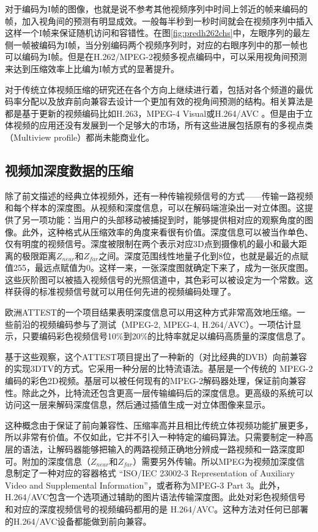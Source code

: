对于编码为I帧的图像，也就是说不参考其他视频序列中时间上邻近的帧来编码的帧，加入视角间的预测有明显成效。一般每半秒到一秒时间就会在视频序列中插入这样一个I帧来保证随机访问和容错性。在图\ref{fig:predh262chs}中，左眼序列的最左侧一帧被编码为I帧，当分别编码两个视频序列时，对应的右眼序列中的那一帧也可以编码为I帧。但是在H.262/MPEG-2视频多视点编码中，可以采用视角间预测来达到压缩效率上比编为I帧方式的显著提升。

对于传统立体视频压缩的研究还在各个方向上继续进行着，包括对各个频道的最优码率分配以及放弃前向兼容去设计一个更加有效的视角间预测的结构。相关算法是都是基于更新的视频编码比如H.263\cite{itu1995h263}，MPEG-4 Visual\cite{itu1999mpeg4}或H.264/AVC \cite{sun2005stereo, wiegand2003overview, itu2003h264}。但是由于立体视频的应用还没有发展到一个足够大的市场，所有这些进展包括原有的多视点类（Multiview profile）都尚未能商业化。

\subsection{视频加深度数据的压缩}

除了前文描述的经典立体视频外，还有一种传输视频信号的方式——传输一路视频和每个样本的深度图。从视频和深度信息，可以在解码端渲染出一对立体图\cite{fehn2002evolutionary,fehn20043d}。这提供了另一项功能：当用户的头部移动被捕捉到时，能够提供相对应的观察角度的图像。此外，这种格式从压缩效率的角度来看很有价值。深度信息可以被当作单色、仅有明度的视频信号。深度被限制在两个表示对应3D点到摄像机的最小和最大距离的极限距离$Z_{near}$和$Z_{far}$之间。深度范围线性地量子化到8位，也就是最近的点赋值255，最远点赋值为0。这样一来，一张深度图就确定下来了，成为一张灰度图。这些灰阶图可以被插入视频信号的光照信道中，其色彩可以被设定为一个常数。这样获得的标准视频信号就可以用任何先进的视频编码处理了。

欧洲ATTEST的一个项目\cite{fehn2002evolutionary}结果表明深度信息可以用这种方式非常高效地压缩。一些前沿的视频编码参与了测试（MPEG-2, MPEG-4, H.264/AVC）。一项估计显示，只要编码彩色视频信号10\%到20\%的比特率就足以编码高质量的深度信息了。

基于这些观察，这个ATTEST项目提出了一种新的（对比经典的DVB）向前兼容的实现3DTV的方式。它采用一种分层的比特流语法。基层是一个传统的 MPEG-2编码的彩色2D视频。基层可以被任何现有的MPEG-2解码器处理，保证前向兼容性。除此之外，比特流还包含更高一层传输编码后的深度信息。更高级的系统可以访问这一层来解码深度信息，然后通过插值生成一对立体图像来显示。

这种概念由于保证了前向兼容性、压缩率高并且相比传统立体视频功能扩展更多，所以非常有价值。不仅如此，它并不引入一种特定的编码算法。只需要制定一种高层的语法，让解码器能够把输入的两路视频正确地分辨成一路视频和一路深度即可。附加的深度信息（$Z_{near}$和$Z_{far}$）需要另外传输。所以MPEG为视频加深度信息制定了一种对应的容器格式 “ISO/IEC 23002-3 Representation of Auxiliary Video and Supplemental Information”，或者称为MPEG-3 Part 3\cite{iso2007rep, iso2007fdam}。此外，H.264/AVC包含一个选项通过辅助的图片语法传输深度图。此处对彩色视频信号和对应的深度视频信号的视频编码都用的是 H.264/AVC。这种方法对任何已部署的H.264/AVC设备都能做到前向兼容。

